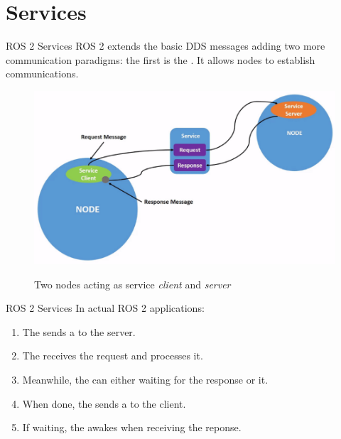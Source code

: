 
\section{Services}
\graphicspath{{figs/section1/}}

\begin{frame}{ROS 2 Services}
ROS 2 extends the basic DDS messages adding two more communication paradigms: the first is the . It allows nodes to establish  communications.
\begin{figure}
  \centering
  \includegraphics[scale=.35]{ros2Srv.png}
  \label{fig:ros2srv}
  \caption{Two nodes acting as service \emph{client} and \emph{server}}
\end{figure}
\end{frame}
\begin{frame}{ROS 2 Services}
In actual ROS 2 applications:
\begin{enumerate}
  \item The  sends a  to the server.
  \item The  receives the request and processes it.
  \item Meanwhile, the  can either  waiting for the response or  it.
  \item When done, the  sends a  to the client.
  \item If waiting, the  awakes when receiving the reponse.
\end{enumerate}
\end{frame}

